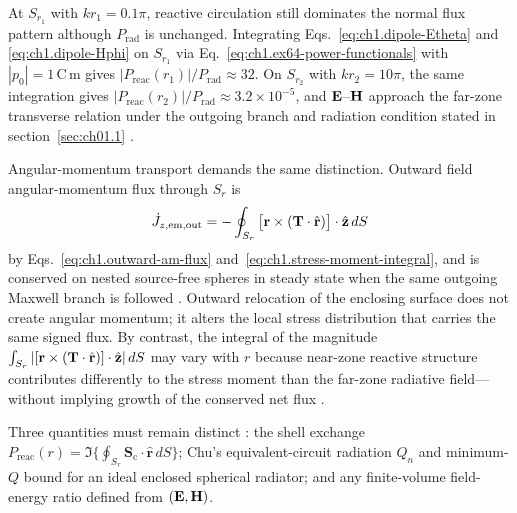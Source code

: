 At $S_{r_1}$ with $kr_1=0.1\pi$, reactive circulation still dominates the normal flux pattern although $P_{\mathrm{rad}}$ is unchanged. Integrating Eqs.~\eqref{eq:ch1.dipole-Etheta} and \eqref{eq:ch1.dipole-Hphi} on $S_{r_1}$ via Eq.~\eqref{eq:ch1.ex64-power-functionals} with $|p_0|=1\,\mathrm{C\,m}$ gives $|P_{\mathrm{reac}}(r_1)|/P_{\mathrm{rad}}\approx 32$. On $S_{r_2}$ with $kr_2=10\pi$, the same integration gives $|P_{\mathrm{reac}}(r_2)|/P_{\mathrm{rad}}\approx 3.2\times 10^{-5}$, and $\mathbf{E}$--$\mathbf{H}$ approach the far-zone transverse relation
under the outgoing branch and radiation condition stated in section~\ref{sec:ch01.1} \cite{stratton1941}.

Angular-momentum transport demands the same distinction. Outward field angular-momentum flux through $S_r$ is
\begin{equation}
\label{eq:ch1.ex64-am-flux-integral}
\dot J_{z,\mathrm{em,out}}
=-\oint_{S_r}\big[\mathbf{r}\times(\mathbf{T}\cdot\hat{\mathbf{r}})\big]\cdot\hat{\mathbf{z}}\,dS
\end{equation}
by Eqs.~\eqref{eq:ch1.outward-am-flux} and~\eqref{eq:ch1.stress-moment-integral}, and is conserved on nested source-free spheres in steady state when the same outgoing Maxwell branch is followed \cite{stratton1941}. Outward relocation of the enclosing surface does not create angular momentum; it alters the local stress distribution that carries the same signed flux. By contrast, the integral of the magnitude $\int_{S_r}|[\mathbf{r}\times(\mathbf{T}\cdot\hat{\mathbf{r}})]\cdot\hat{\mathbf{z}}|\,dS$ may vary with $r$ because near-zone reactive structure contributes differently to the stress moment than the far-zone radiative field---without implying growth of the conserved net flux \cite{stratton1941,beth1936}.

Three quantities must remain distinct \cite{chu1948,mcclean1996,stratton1941}: the shell exchange $P_{\mathrm{reac}}(r)=\Im\{\oint_{S_r}\mathbf{S}_\mathrm{c}\cdot\hat{\mathbf{r}}\,dS\}$; Chu's equivalent-circuit radiation $Q_n$ and minimum-$Q$ bound for an ideal enclosed spherical radiator; and any finite-volume field-energy ratio defined from $(\mathbf{E},\mathbf{H})$.


